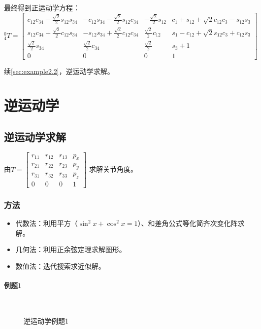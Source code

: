 \documentclass[
12pt, %
a4paper, 
oneside, %
headinclude,footinclude, %
]{scrartcl}
\begin{document}
最终得到正运动学方程：
$$
^0_4T = 
\begin{bmatrix}
c_{12}c_{34} - \frac{\sqrt{2}}{2}s_{12}s_{34} & -c_{12}s_{34} - \frac{\sqrt{2}}{2}s_{12}c_{34} & -\frac{\sqrt{2}}{2}s_{12} & c_1 + s_{12} + \sqrt{2}c_{12}c_3 - s_{12}s_3 \\
s_{12}c_{34} + \frac{\sqrt{2}}{2}c_{12}s_{34} & -s_{12}s_{34} + \frac{\sqrt{2}}{2}c_{12}c_{34} & \frac{\sqrt{2}}{2}c_{12} & s_1 - c_{12} + \sqrt{2}s_{12}c_3 + c_{12}s_3 \\
\frac{\sqrt{2}}{2}s_{34} & \frac{\sqrt{2}}{2}c_{34} & \frac{\sqrt{2}}{2} & s_3 + 1 \\
0 & 0 & 0 & 1
\end{bmatrix}
$$

续\ref{sec:example2.2}，逆运动学求解。
\section{逆运动学}
\subsection{逆运动学求解}
由$ T = \begin{bmatrix} r_{11} & r_{12} & r_{13} & p_x \\ r_{21} & r_{22} & r_{23} & p_y \\ r_{31} & r_{32} & r_{33} & p_z \\ 0 & 0 & 0 & 1 \end{bmatrix} $
求解关节角度。
\subsubsection{方法}
\begin{itemize}
\item 代数法：利用平方（$ \sin^2x + \cos^2x = 1 $）、和差角公式等化简齐次变化阵求解。
\item 几何法：利用正余弦定理求解图形。
\item 数值法：迭代搜索求近似解。
\end{itemize} 
\paragraph{例题1}
\begin{figure}[H]
\centering
\subfloat[代数法]{\texttt{[image: 3.1]}} \\
\subfloat[几何法]{\texttt{[image: 3.2]}}
\caption[逆运动学例题1]{逆运动学例题1}
\end{figure}
\end{document}
